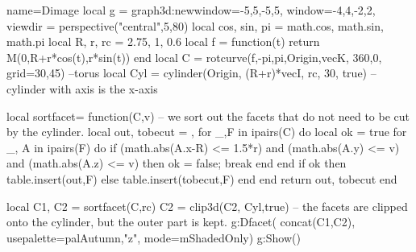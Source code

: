 \documentclass[border=5pt]{standalone}%
\begin{document}
\begin{luadraw}{name=Dimage}
local g = graph3d:new{window={-5,5,-5,5}, window={-4,4,-2,2}, viewdir = perspective("central",5,80) }
local cos, sin, pi = math.cos, math.sin, math.pi
local R, r, rc = 2.75, 1, 0.6
local f = function(t) return M(0,R+r*cos(t),r*sin(t)) end
local C  = rotcurve(f,-pi,pi,{Origin,vecK}, 360,0, {grid={30,45}}) --torus
local Cyl = cylinder(Origin, (R+r)*vecI, rc, 30, true) -- cylinder with axis is the x-axis

local sortfacet= function(C,v) -- we sort out the facets that do not need to be cut by the cylinder.
    local out, tobecut = {},{}
    for _,F in ipairs(C) do
        local ok = true
        for _, A in ipairs(F) do
            if (math.abs(A.x-R) <= 1.5*r) and (math.abs(A.y) <= v) and (math.abs(A.z) <= v) then ok = false; break end
        end
        if ok then table.insert(out,F) else table.insert(tobecut,F) end
    end
    return out, tobecut
end

local C1, C2 = sortfacet(C,rc)
C2 = clip3d(C2, Cyl,true) -- the facets are clipped onto the cylinder, but the outer part is kept.
g:Dfacet( concat(C1,C2), {usepalette={palAutumn,"z"}, mode=mShadedOnly})
g:Show()
\end{luadraw}
\end{document}
